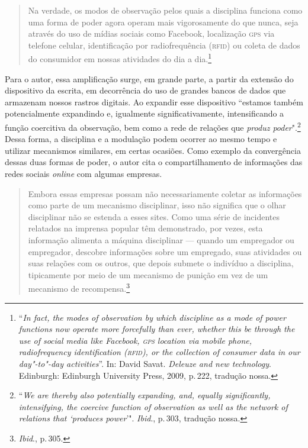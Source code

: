 \begin{quote}
Na verdade, os modos de observação pelos quais a disciplina funciona
como uma forma de poder agora operam mais vigorosamente do que nunca,
seja através do uso de mídias sociais como Facebook, localização \textsc{gps} via
telefone celular, identificação por radiofrequência (\textsc{rfid}) ou coleta de
dados do consumidor em nossas atividades do dia a dia.\footnote{``\emph{In
  fact, the modes of observation by which discipline as a mode of power
  functions now operate more forcefully than ever, whether this be
  through the use of social media like Facebook, \textsc{gps} location via mobile
  phone, radiofrequency identification (\textsc{rfid}), or the collection of
  consumer data in our day"-to"-day activities}''. In: David Savat. \emph{Deleuze and new technology}. Edinburgh: Edinburgh University Press, 2009, p.\,222, tradução nossa.} 
\end{quote}

Para o autor, essa amplificação surge, em grande parte, a partir da
extensão do dispositivo da escrita, em decorrência do uso de grandes
bancos de dados que armazenam nossos rastros digitais. Ao expandir esse
dispositivo ``estamos também potencialmente expandindo e, igualmente
significativamente, intensificando a função coercitiva da observação,
bem como a rede de relações que \textit{produz poder}".\footnote{``\emph{We are
  thereby also potentially expanding, and, equally significantly,
  intensifying, the coercive function of observation as well as the
  network of relations that `produces power}'". \textit{Ibid}., p.\,303, tradução nossa.}
Dessa forma, a disciplina e a modulação podem ocorrer ao mesmo tempo e
utilizar mecanismos similares, em certas ocasiões. Como exemplo da
convergência dessas duas formas de poder, o autor cita o
compartilhamento de informações das redes sociais \emph{online} com algumas
empresas.

\begin{quote}
Embora essas empresas possam não necessariamente coletar as informações
como parte de um mecanismo disciplinar, isso não significa que o olhar
disciplinar não se estenda a esses sites. Como uma série de incidentes
relatados na imprensa popular têm demonstrado, por vezes, esta
informação alimenta a máquina disciplinar --- quando um empregador ou
empregador, descobre informações sobre um empregado, suas atividades ou
suas relações com os outros, que depois submete o indivíduo a
disciplina, tipicamente por meio de um mecanismo de punição em vez de um
mecanismo de recompensa.\footnote{\textit{Ibid}., p.\,305.}
\end{quote}

